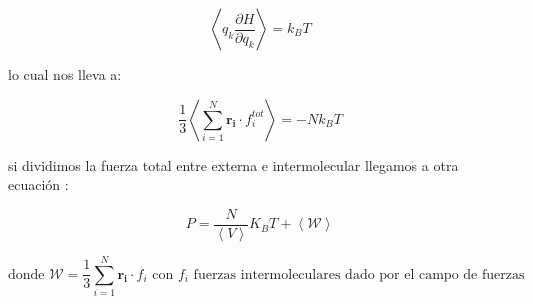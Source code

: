 \begin{equation} \label{virialtheoremq}
    \left \langle q_k \frac{\partial H}{\partial q_k} \right \rangle = k_B T
\end{equation}

lo cual nos lleva a:

\begin{equation} \label{virialtheorempress}
    \frac{1}{3}\left \langle \sum_{i=1}^N \mathbf{r_i} \cdot f^{tot}_i \right \rangle = -N k_B T
\end{equation}

si dividimos la fuerza total entre externa e intermolecular llegamos a otra ecuación \cite{Allen2017}:

\begin{equation} \label{virialsumconstpress}
    P = \frac{N}{\left \langle V \right \rangle} K_B T + \left \langle \mathcal{W} \right \rangle
\end{equation}

\begin{equation*}
     \text{donde } \mathcal{W} = \frac{1}{3} \sum_{i=1}^N \mathbf{r_i} \cdot f_i \text{ con $f_i$ fuerzas intermoleculares dado por el campo de fuerzas}
\end{equation*}


